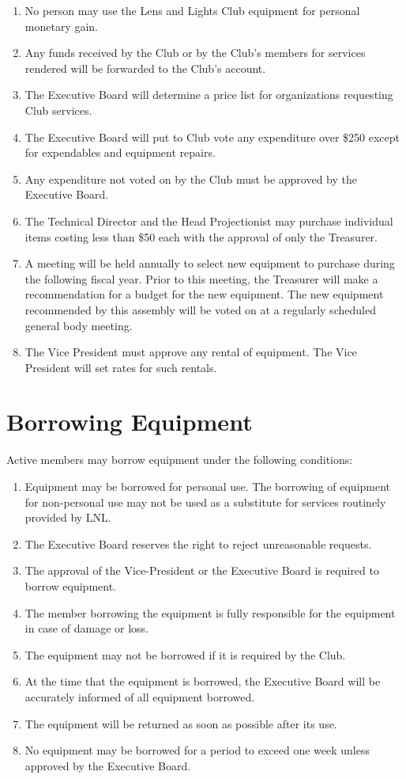 \documentclass[12pt,letterpaper,oneside]{book}
\begin{document}
\begin{enumerate}

\item No person may use the Lens and Lights Club equipment for personal monetary gain.
\item Any funds received by the Club or by the Club's members for services rendered will be forwarded to the Club's account.
\item The Executive Board will determine a price list for organizations requesting Club services.
\item The Executive Board will put to Club vote any expenditure over \$250 except for expendables and equipment repairs.
\item Any expenditure not voted on by the Club must be approved by the Executive Board.
\item The Technical Director and the Head Projectionist may purchase individual items costing less than \$50 each with the approval of only the Treasurer.
\item A meeting will be held annually to select new equipment to purchase during the following fiscal year. Prior to this meeting, the Treasurer will make a recommendation for a budget for the new equipment. The new equipment recommended by this assembly will be voted on at a regularly scheduled general body meeting.
\item The Vice President must approve any rental of equipment. The Vice President will set rates for such rentals.

\end{enumerate}

\section{Borrowing Equipment}

Active members may borrow equipment under the following conditions:

\begin{enumerate}

\item Equipment may be borrowed for personal use. The borrowing of equipment for non-personal use may not be used as a substitute for services routinely provided by LNL.
\item The Executive Board reserves the right to reject unreasonable requests.
\item The approval of the Vice-President or the Executive Board is required to borrow equipment.
\item The member borrowing the equipment is fully responsible for the equipment in case of damage or loss.
\item The equipment may not be borrowed if it is required by the Club.
\item At the time that the equipment is borrowed, the Executive Board will be accurately informed of all equipment borrowed.
\item The equipment will be returned as soon as possible after its use.
\item No equipment may be borrowed for a period to exceed one week unless approved by the Executive Board.

\end{enumerate}
\end{document}

